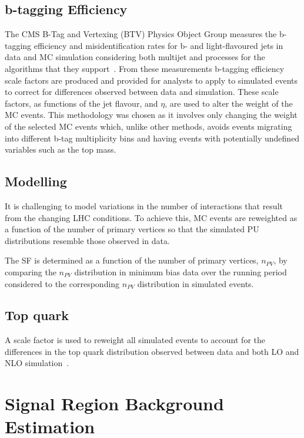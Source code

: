 \subsection{b-tagging Efficiency}\label{subsec:btagEff}
The CMS B-Tag and Vertexing (BTV) Physics Object Group measures the b-tagging efficiency and misidentification rates for b- and light-flavoured jets in data and MC simulation considering both multijet and \ttbar processes for the algorithms that they support~\cite{Sirunyan:2017ezt}.
From these measurements b-tagging efficiency scale factors are produced and provided for analysts to apply to simulated events to correct for differences observed between data and simulation.
These scale factors, as functions of the jet flavour, \pT and $\eta$, are used to alter the weight of the MC events.
This methodology was chosen as it involves only changing the weight of the selected MC events which, unlike other methods, avoids events migrating into different b-tag multiplicity bins and having events with potentially undefined variables such as the top mass.

\subsection{\PU Modelling}\label{subsec:puSF}
It is challenging to model variations in the number of \PU interactions that result from the changing LHC conditions.
To achieve this, MC events are reweighted as a function of the number of primary vertices so that the simulated PU distributions resemble those observed in data.

The \PU SF is determined as a function of the number of primary vertices, $n_{PV}$, by comparing the $n_{PV}$ distribution in minimum bias data over the running period considered to the corresponding $n_{PV}$ distribution in simulated events.

\subsection{Top quark \pt}
A scale factor is used to reweight all simulated \ttbar events to account for the differences in the top quark \pt distribution observed between data and both LO and NLO simulation~\cite{Khachatryan:2015oqa}.

\section{Signal Region Background Estimation}\label{sec:simBackgrounds}

